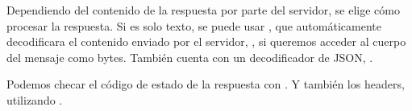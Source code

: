 Dependiendo del contenido de la respuesta por parte del servidor, se elige cómo
procesar la respuesta. Si es solo texto, se puede usar ,
que automáticamente decodificara el contenido enviado por el servidor,
, si queremos acceder al cuerpo del mensaje como bytes.
También cuenta con un decodificador de JSON, .

Podemos checar el código de estado de la respuesta con
. Y también los headers, utilizando .